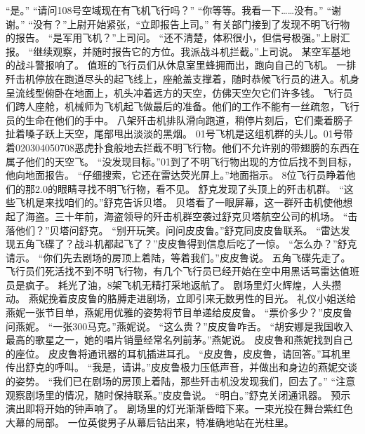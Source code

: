 \documentclass[a4paper,12pt,UTF8,twoside]{ctexbook}
\begin{document}
        “是。” 
        “请问108号空域现在有飞机飞行吗？” 
        “你等等。我看一下……没有。” 
        “谢谢。” 
        “没有？”上尉开始紧张，“立即报告上司。” 
        有关部门接到了发现不明飞行物的报告。 
        “是军用飞机？”上司问。 
        “还不清楚，体积很小，但信号极强。”上尉汇报。 
        “继续观察，并随时报告它的方位。我派战斗机拦截。”上司说。 
        某空军基地的战斗警报响了。 
        值班的飞行员们从休息室里蜂拥而出，跑向自己的飞机。 
        一排歼击机停放在跑道尽头的起飞线上，座舱盖支撑着，随时恭候飞行员的进入。机身呈流线型俯卧在地面上，机头冲着远方的天空，仿佛天空欠它们许多钱。 
        飞行员们跨人座舱，机械师为飞机起飞做最后的准备。他们的工作不能有一丝疏忽，飞行员的生命在他们的手中。 
        八架歼击机排队滑向跑道，稍停片刻后，它们橐着膀子扯着嗓子跃上天空，尾部甩出淡淡的黑烟。 
        01号飞机是这组机群的头儿。01号带着020304050708恶虎扑食般地去拦截不明飞行物。他们不允许别的带翅膀的东西在属子他们的天空飞。 
        “没发现目标。”01到了不明飞行物出现的方位后找不到目标，他向地面报告。 
        “仔细搜索，它还在雷达荧光屏上。”地面指示。 
        8位飞行员睁着他们的那2.0的眼睛寻找不明飞行物，看不见。 
        舒克发现了头顶上的歼击机群。 
        “这些飞机是来找咱们的。”舒克告诉贝塔。 
        贝塔看了一眼屏幕，这一群歼击机使他想起了海盗。三十年前，海盗领导的歼击机群空袭过舒克贝塔航空公司的机场。 
        “击落他们？”贝塔问舒克。 
        “别开玩笑。问问皮皮鲁。”舒克同皮皮鲁联系。 
        “雷达发现五角飞碟了？战斗机都起飞了？”皮皮鲁得到信息后吃了一惊。 
      “怎么办？”舒克请示。 
      “你们先去剧场的房顶上着陆，等着我们。”皮皮鲁说。 
        五角飞碟先走了。 
        飞行员们死活找不到不明飞行物，有几个飞行员已经开始在空中用黑话骂雷达值班员是疯子。 
        耗光了油，8架飞机无精打采地返航了。 
        剧场里灯火辉煌，人头攒动。 
        燕妮挽着皮皮鲁的胳膊走进剧场，立即引来无数男性的目光。 
        礼仪小姐送给燕妮一张节目单，燕妮用优雅的姿势将节目单递给皮皮鲁。 
        “票价多少？”皮皮鲁问燕妮。 
        “一张300马克。”燕妮说。 
        “这么贵？”皮皮鲁咋舌。 
        “胡安娜是我国收入最高的歌星之一，她的唱片销量经常名列前茅。”燕妮说。 
        皮皮鲁和燕妮找到自己的座位。 
        皮皮鲁将通讯器的耳机插进耳孔。 
        “皮皮鲁，皮皮鲁，请回答。”耳机里传出舒克的呼叫。 
        “我是，请讲。”皮皮鲁极力压低声音，并做出和身边的燕妮交谈的姿势。 
        “我们已在剧场的房顶上着陆，那些歼击机没发现我们，回去了。” 
        “注意观察剧场里的情况，随时保持联系。”皮皮鲁说。 
        “明白。”舒克关闭通讯器。 
        预示演出即将开始的钟声响了。 
        剧场里的灯光渐渐昏暗下来。一束光投在舞台紫红色大幕的局部。 
        一位英俊男子从幕后钻出来，特准确地站在光柱里。 
\end{document}
